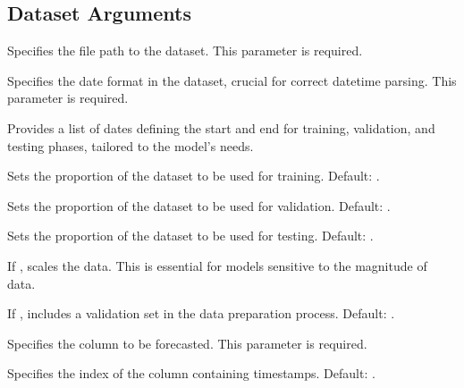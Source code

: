 \documentclass[letterpaper,10pt,english]{sphinxmanual}
\begin{document}
\subsection{Dataset Arguments}
\label{\detokenize{docs/parser_arguments:dataset-arguments}}\begin{description}
\sphinxAtStartPar
Specifies the file path to the dataset. This parameter is required.

\sphinxAtStartPar
Specifies the date format in the dataset, crucial for correct datetime parsing. This parameter is required.

\sphinxAtStartPar
Provides a list of dates defining the start and end for training, validation, and testing phases, tailored to the model’s needs.

\sphinxAtStartPar
Sets the proportion of the dataset to be used for training. Default: .

\sphinxAtStartPar
Sets the proportion of the dataset to be used for validation. Default: .

\sphinxAtStartPar
Sets the proportion of the dataset to be used for testing. Default: .

\sphinxAtStartPar
If , scales the data. This is essential for models sensitive to the magnitude of data.

\sphinxAtStartPar
If , includes a validation set in the data preparation process. Default: .

\sphinxAtStartPar
Specifies the column to be forecasted. This parameter is required.

\sphinxAtStartPar
Specifies the index of the column containing timestamps. Default: .

\end{description}
\end{document}
